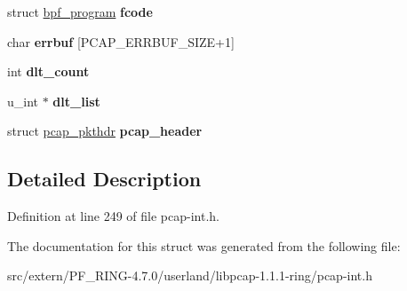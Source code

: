 \begin{DoxyCompactItemize}
\item 
\hypertarget{structpcap_ac2e3cff5ae58932640ff637360a28303}{
struct \hyperlink{structbpf__program}{bpf\_\-program} {\bfseries fcode}}
\label{structpcap_ac2e3cff5ae58932640ff637360a28303}

\item 
\hypertarget{structpcap_aefd1741f2d10084c3428b12f55e099e7}{
char {\bfseries errbuf} \mbox{[}PCAP\_\-ERRBUF\_\-SIZE+1\mbox{]}}
\label{structpcap_aefd1741f2d10084c3428b12f55e099e7}

\item 
\hypertarget{structpcap_a59eb96a7125039ead9a639eb7de85115}{
int {\bfseries dlt\_\-count}}
\label{structpcap_a59eb96a7125039ead9a639eb7de85115}

\item 
\hypertarget{structpcap_a830021dded88970185223ee649027775}{
u\_\-int $\ast$ {\bfseries dlt\_\-list}}
\label{structpcap_a830021dded88970185223ee649027775}

\item 
\hypertarget{structpcap_a48f00a53b9c95336c989466ebd7d5c2c}{
struct \hyperlink{structpcap__pkthdr}{pcap\_\-pkthdr} {\bfseries pcap\_\-header}}
\label{structpcap_a48f00a53b9c95336c989466ebd7d5c2c}

\end{DoxyCompactItemize}


\subsection{Detailed Description}


Definition at line 249 of file pcap-\/int.h.



The documentation for this struct was generated from the following file:\begin{DoxyCompactItemize}
\item 
src/extern/PF\_\-RING-\/4.7.0/userland/libpcap-\/1.1.1-\/ring/pcap-\/int.h\end{DoxyCompactItemize}
